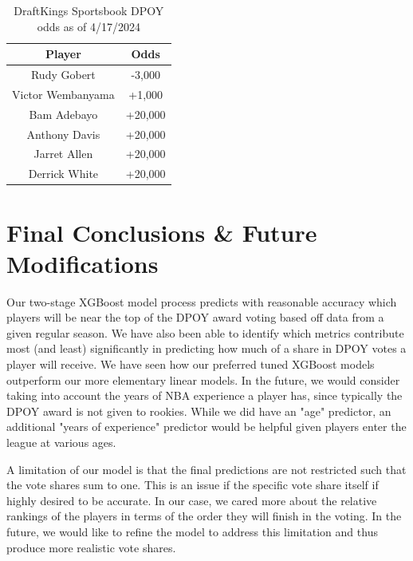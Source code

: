 \documentclass[letterpaper,titlepage]{article}
\begin{document}
    \begin{table}[H]
        \centering
        \caption{DraftKings Sportsbook DPOY odds as of 4/17/2024}
        \label{Tab:Vegas}
        \begin{tabular}{c|c}
            \textbf{Player}   & \textbf{Odds} \\ \hline
            \rowcolor[HTML]{EFEFEF} 
            Rudy Gobert       & -3,000        \\
            Victor Wembanyama & +1,000        \\
            \rowcolor[HTML]{EFEFEF} 
            Bam Adebayo       & +20,000       \\
            Anthony Davis     & +20,000       \\
            \rowcolor[HTML]{EFEFEF} 
            Jarret Allen      & +20,000       \\
            Derrick White     & +20,000      
        \end{tabular}
    \end{table}


    \section{Final Conclusions \& Future Modifications}
    Our two-stage XGBoost model process predicts with reasonable accuracy which players will be near the top of the DPOY award voting based off data from a given regular season. We have also been able to identify which metrics contribute most (and least) significantly in predicting how much of a share in DPOY votes a player will receive. We have seen how our preferred tuned XGBoost models outperform our more elementary linear models. In the future, we would consider taking into account the years of NBA experience a player has, since typically the DPOY award is not given to rookies. While we did have an "age" predictor, an additional "years of experience" predictor would be helpful given players enter the league at various ages.

    A limitation of our model is that the final predictions are not restricted such that the vote shares sum to one. This is an issue if the specific vote share itself if highly desired to be accurate. In our case, we cared more about the relative rankings of the players in terms of the order they will finish in the voting. In the future, we would like to refine the model to address this limitation and thus produce more realistic vote shares.


    \printbibliography[heading=bibnumbered]
\end{document}
